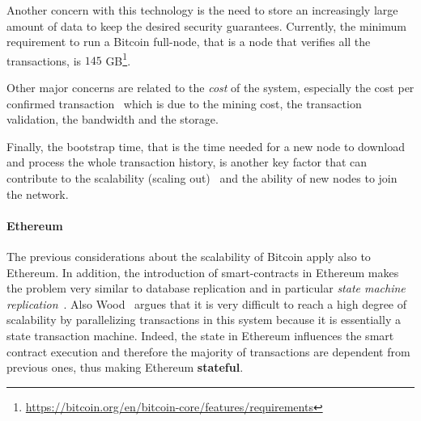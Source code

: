 Another concern with this technology is the need to store an increasingly large
amount of data to keep the desired security guarantees. Currently, the minimum
requirement to run a Bitcoin full-node, that is a node that verifies all the
transactions, is $145$
GB\footnote{\url{https://bitcoin.org/en/bitcoin-core/features/requirements}}.

Other major concerns are related to the \emph{cost} of the system, especially
the cost per confirmed transaction~\cite{bib:scaling-croman} which is due to the
mining cost, the transaction validation, the bandwidth and the storage.

Finally, the bootstrap time, that is the time needed for a new node to download
and process the whole transaction history, is another key factor that can
contribute to the scalability (scaling out)~\cite{bib:scaling-croman} and the
ability of new nodes to join the network.

\paragraph{Ethereum}
The previous considerations about the scalability of Bitcoin apply also to
Ethereum. In addition, the introduction of smart-contracts in Ethereum makes the
problem very similar to database replication and in particular \emph{state
machine replication}~\cite{bib:the-quest}. Also Wood~\cite{wood2018ethereum}
argues that it is very difficult to reach a high degree of scalability by
parallelizing transactions in this system because it is essentially a state
transaction machine. Indeed, the state in Ethereum influences the smart contract
execution and therefore the majority of transactions are dependent from previous
ones, thus making Ethereum \textbf{stateful}.

